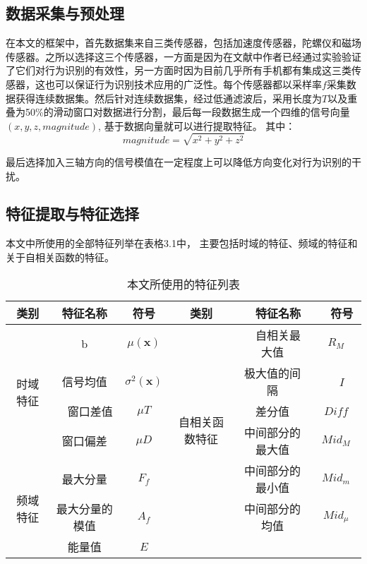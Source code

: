 \subsection{数据采集与预处理}
\par 在本文的框架中，首先数据集来自三类传感器，包括加速度传感器，陀螺仪和磁场传感器。之所以选择这三个传感器，一方面是因为在文献中\cite{diffSensors}作者已经通过实验验证了它们对行为识别的有效性，另一方面时因为目前几乎所有手机都有集成这三类传感器，这也可以保证行为识别技术应用的广泛性。每个传感器都以采样率$f$采集数据获得连续数据集。然后针对连续数据集，经过低通滤波后，采用长度为$T$以及重叠为50\%的滑动窗口对数据进行分割，最后每一段数据生成一个四维的信号向量$(x, y, z, magnitude)$, 基于数据向量就可以进行提取特征。 其中：
\begin{equation}
	magnitude = \sqrt{x^2+y^2+z^2}
\end{equation}
\par 最后选择加入三轴方向的信号模值在一定程度上可以降低方向变化对行为识别的干扰。

\subsection{特征提取与特征选择}
本文中所使用的全部特征列举在表格3.1中， 主要包括时域的特征、频域的特征和关于自相关函数的特征。
\begin{table}[!hbp]
\begin{tabular}{|c|c|c|c|c|c|}
\hline
类别 & 特征名称 & 符号 & 类别 &　特征名称　&　符号　\\
\hline
\multirow{4}{*}{时域特征} & b　& $\mu (\textbf{x})$ & \multirow{6}{*}{自相关函数特征}　&　自相关最大值 & $R_M$ \\
\cline{2-3} \cline{5-6}
& 信号均值　& $\sigma ^2 (\textbf{x})$ & & 极大值的间隔　&　$I$  \\
\cline{2-3} \cline{5-6}
&　窗口差值 & $\mu T$ & & 差分值 & $Diff$ \\
\cline{2-3} \cline{5-6}
& 窗口偏差 & $\mu D$ & & 中间部分的最大值 & $Mid_M$ \\
\cline{1-3} \cline{5-6}
\multirow{3}{*}{频域特征} & 最大分量 & $F_f$ & & 中间部分的最小值 & $Mid_m$ \\
\cline{2-3} \cline{5-6}
& 最大分量的模值 & $A_f$ & & 中间部分的均值 & $Mid_{\mu}$ \\
\cline{2-6}
& 能量值 & $E$ & & & \\
\hline
\end{tabular}
\caption{本文所使用的特征列表} %
\end{table}


